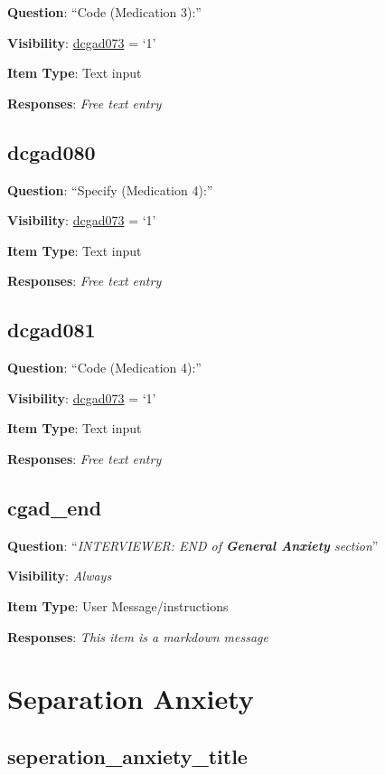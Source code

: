 \documentclass[]{book}
\begin{document}
\textbf{Question}: ``Code (Medication 3):''

\textbf{Visibility}: \protect\hyperlink{dcgad073}{dcgad073} = `1'

\textbf{Item Type}: Text input

\textbf{Responses}: \emph{Free text entry}

\hypertarget{dcgad080}{%
\section{dcgad080}\label{dcgad080}}

\textbf{Question}: ``Specify (Medication 4):''

\textbf{Visibility}: \protect\hyperlink{dcgad073}{dcgad073} = `1'

\textbf{Item Type}: Text input

\textbf{Responses}: \emph{Free text entry}

\hypertarget{dcgad081}{%
\section{dcgad081}\label{dcgad081}}

\textbf{Question}: ``Code (Medication 4):''

\textbf{Visibility}: \protect\hyperlink{dcgad073}{dcgad073} = `1'

\textbf{Item Type}: Text input

\textbf{Responses}: \emph{Free text entry}

\hypertarget{cgad_end}{%
\section{cgad\_end}\label{cgad_end}}

\textbf{Question}: ``\emph{INTERVIEWER: END of \textbf{General Anxiety} section}''

\textbf{Visibility}: \emph{Always}

\textbf{Item Type}: User Message/instructions

\textbf{Responses}: \emph{This item is a markdown message}

\hypertarget{separation_anxiety_section}{%
\chapter{Separation Anxiety}\label{separation_anxiety_section}}

\hypertarget{seperation_anxiety_title}{%
\section{seperation\_anxiety\_title}\label{seperation_anxiety_title}}
\end{document}
